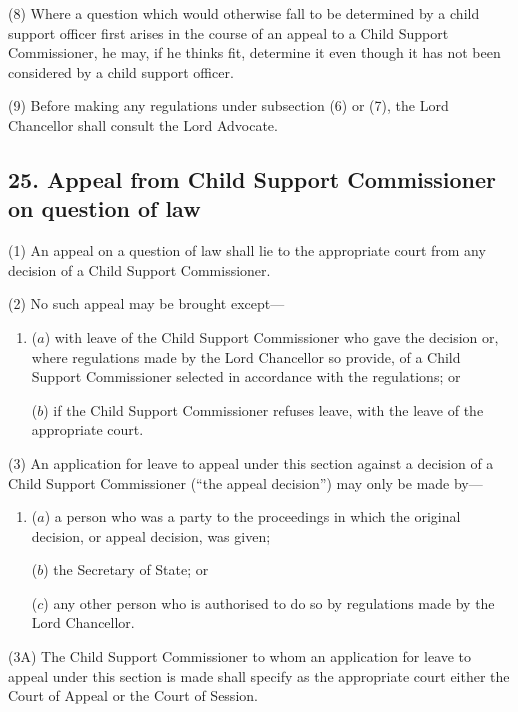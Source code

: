 \documentclass[12pt,a4paper]{article}
\begin{document}
(8) Where a question which would otherwise fall to be determined by a child support officer first arises in the course of an appeal to a Child Support Commissioner, he may, if he thinks fit, determine it even though it has not been considered by a child support officer.

(9) Before making any regulations under subsection (6)  or (7), the Lord Chancellor shall consult the Lord Advocate.


\subsection{25. Appeal from Child Support Commissioner on question of law}

(1) An appeal on a question of law shall lie to the appropriate court from any decision of a Child Support Commissioner.

(2) No such appeal may be brought except—
\begin{enumerate}\item[]
($a$) with leave of the Child Support Commissioner who gave the decision or, where regulations made by the Lord Chancellor so provide, of a Child Support Commissioner selected in accordance with the regulations; or

($b$) if the Child Support Commissioner refuses leave, with the leave of the appropriate court.
\end{enumerate}

(3) An application for leave to appeal under this section against a decision of a Child Support Commissioner (“the appeal decision”) may only be made by—
\begin{enumerate}\item[]
($a$) a person who was a party to the proceedings in which the original decision, or appeal decision, was given;

($b$) the Secretary of State; or

($c$) any other person who is authorised to do so by regulations made by the Lord Chancellor.
\end{enumerate}

(3A) The Child Support Commissioner to whom an application for leave to appeal under this section is made shall specify as the appropriate court either the Court of Appeal or the Court of Session.
\end{document}
